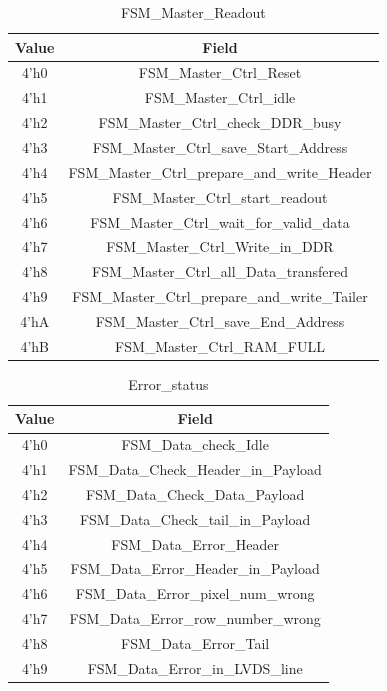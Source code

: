 \begin{table}
\caption{\label{FSM_Master_Readout} FSM\_Master\_Readout}
\begin{center}
\begin{tabular}{|c|c|}
\hline
Value				& Field 	\\	
\hline
4'h0				& FSM\_Master\_Ctrl\_Reset \\
\hline
4'h1				& FSM\_Master\_Ctrl\_idle \\
\hline
4'h2				& FSM\_Master\_Ctrl\_check\_DDR\_busy \\
\hline
4'h3				& FSM\_Master\_Ctrl\_save\_Start\_Address \\
\hline
4'h4				& FSM\_Master\_Ctrl\_prepare\_and\_write\_Header \\
\hline
4'h5				& FSM\_Master\_Ctrl\_start\_readout \\
\hline
4'h6				& FSM\_Master\_Ctrl\_wait\_for\_valid\_data \\
\hline
4'h7				& FSM\_Master\_Ctrl\_Write\_in\_DDR \\
\hline
4'h8				& FSM\_Master\_Ctrl\_all\_Data\_transfered \\
\hline
4'h9				& FSM\_Master\_Ctrl\_prepare\_and\_write\_Tailer \\
\hline
4'hA				& FSM\_Master\_Ctrl\_save\_End\_Address \\
\hline
4'hB				& FSM\_Master\_Ctrl\_RAM\_FULL \\


\hline
\end{tabular}
\end{center}
\end{table}


\begin{table}
\caption{\label{Error_status} Error\_status}
\begin{center}
\begin{tabular}{|c|c|}
\hline
Value				& Field 	\\	
\hline
4'h0				& FSM\_Data\_check\_Idle \\
\hline
4'h1				& FSM\_Data\_Check\_Header\_in\_Payload \\
\hline
4'h2				& FSM\_Data\_Check\_Data\_Payload \\
\hline
4'h3				& FSM\_Data\_Check\_tail\_in\_Payload \\
\hline
4'h4				& FSM\_Data\_Error\_Header \\
\hline
4'h5				& FSM\_Data\_Error\_Header\_in\_Payload \\
\hline
4'h6				& FSM\_Data\_Error\_pixel\_num\_wrong \\
\hline
4'h7				& FSM\_Data\_Error\_row\_number\_wrong \\
\hline
4'h8				& FSM\_Data\_Error\_Tail \\
\hline
4'h9				& FSM\_Data\_Error\_in\_LVDS\_line \\
\hline
\end{tabular}
\end{center}
\end{table}


